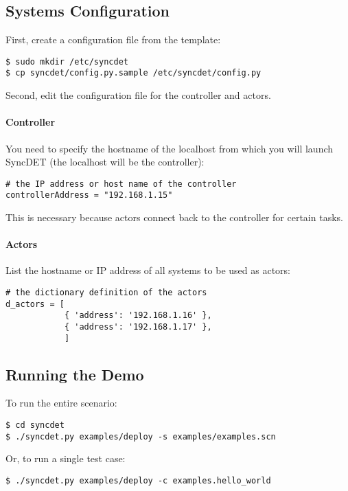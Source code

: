 \subsection{Systems Configuration}
First, create a configuration file from the template:
\begin{verbatim}
$ sudo mkdir /etc/syncdet
$ cp syncdet/config.py.sample /etc/syncdet/config.py
\end{verbatim}

Second, edit the configuration file for the controller and actors. 

\paragraph{Controller} 
You need to specify the hostname of the localhost from which you will launch
SyncDET (the localhost will be the controller):
\begin{verbatim}
# the IP address or host name of the controller
controllerAddress = "192.168.1.15"
\end{verbatim}
This is necessary because actors connect back to the controller for certain tasks.

\paragraph{Actors} 
List the hostname or IP address of all systems to be used as actors:
\begin{verbatim}
# the dictionary definition of the actors
d_actors = [
            { 'address': '192.168.1.16' },
            { 'address': '192.168.1.17' },
            ]
\end{verbatim}

\subsection{Running the Demo}

To run the entire scenario:
\begin{verbatim}
$ cd syncdet
$ ./syncdet.py examples/deploy -s examples/examples.scn
\end{verbatim}

Or, to run a single test case:
\begin{verbatim}
$ ./syncdet.py examples/deploy -c examples.hello_world
\end{verbatim}
